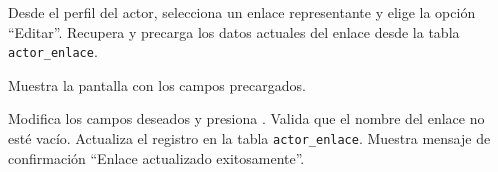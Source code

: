 \begin{UCtrayectoria}
	\UCpaso[\UCactor] Desde el perfil del actor, selecciona un enlace representante y elige la opción ``Editar''.
	\UCpaso Recupera y precarga los datos actuales del enlace desde la tabla \texttt{actor\_enlace}.
	
	\UCpaso Muestra la pantalla  con los campos precargados.
	
	
	\UCpaso[\UCactor] \label{CU-53.modificaEnlace} Modifica los campos deseados y presiona .
	\UCpaso Valida que el nombre del enlace no esté vacío. 
	\UCpaso Actualiza el registro en la tabla \texttt{actor\_enlace}.
	\UCpaso Muestra mensaje de confirmación ``Enlace actualizado exitosamente''.
\end{UCtrayectoria}

